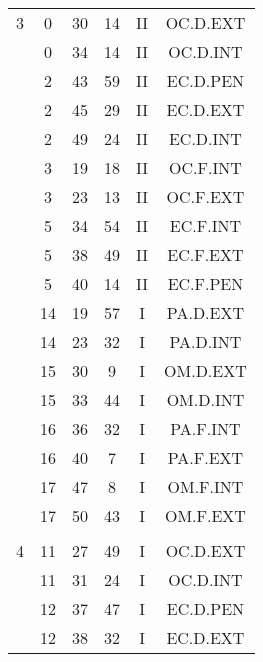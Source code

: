 \documentclass[12pt, a4paper]{article}
\begin{document}
\begin{multicols}{3}
{\begin{tabular}{c c c c c c}
	 	 	 	3 & 0 & 30 & 14 & II & OC.D.EXT\\%
	 	 	 	 & 0 & 34 & 14 & II & OC.D.INT\\%
	 	 	 	 & 2 & 43 & 59 & II & EC.D.PEN\\%
	 	 	 	 & 2 & 45 & 29 & II & EC.D.EXT\\%
	 	 	 	 & 2 & 49 & 24 & II & EC.D.INT\\%
	 	 	 	 & 3 & 19 & 18 & II & OC.F.INT\\%
	 	 	 	 & 3 & 23 & 13 & II & OC.F.EXT\\%
	 	 	 	 & 5 & 34 & 54 & II & EC.F.INT\\%
	 	 	 	 & 5 & 38 & 49 & II & EC.F.EXT\\%
	 	 	 	 & 5 & 40 & 14 & II & EC.F.PEN\\%
	 	 	 	 & 14 & 19 & 57 & I & PA.D.EXT\\%
	 	 	 	 & 14 & 23 & 32 & I & PA.D.INT\\%
	 	 	 	 & 15 & 30 & 9 & I & OM.D.EXT\\%
	 	 	 	 & 15 & 33 & 44 & I & OM.D.INT\\%
	 	 	 	 & 16 & 36 & 32 & I & PA.F.INT\\%
	 	 	 	 & 16 & 40 & 7 & I & PA.F.EXT\\%
	 	 	 	 & 17 & 47 & 8 & I & OM.F.INT\\%
	 	 	 	 & 17 & 50 & 43 & I & OM.F.EXT\\%
	 	 	 	 & & & & & \\%
	 	 	 	4 & 11 & 27 & 49 & I & OC.D.EXT\\%
	 	 	 	 & 11 & 31 & 24 & I & OC.D.INT\\%
	 	 	 	 & 12 & 37 & 47 & I & EC.D.PEN\\%
	 	 	 	 & 12 & 38 & 32 & I & EC.D.EXT\\%

\end{tabular}}
\end{multicols}
\end{document}
